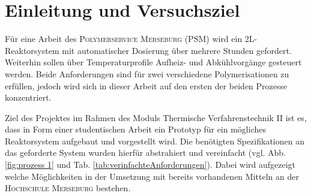 \section{Einleitung und Versuchsziel}
\label{sec:aufgabenstellung}

Für eine Arbeit des \textsc{Polymerservice Merseburg (PSM)} wird ein 2L-Reaktorsystem mit automatischer Dosierung über mehrere Stunden gefordert. Weiterhin sollen über Temperaturprofile Aufheiz- und Abkühlvorgänge gesteuert werden. Beide Anforderungen sind für zwei verschiedene Polymerisationen zu erfüllen, jedoch wird sich in dieser Arbeit auf den ersten der beiden Prozesse konzentriert. 

Ziel des Projektes im Rahmen des Moduls Thermische Verfahrenstechnik II ist es, dass in Form einer studentischen Arbeit ein Prototyp für ein mögliches Reaktorsystem aufgebaut und vorgestellt wird. Die benötigten Spezifikationen an das geforderte System wurden hierfür abstrahiert und vereinfacht (vgl. Abb. \ref{fig:prozess 1} und Tab. \ref{tab:verinfachteAnforderungen}). Dabei wird aufgezeigt welche Möglichkeiten in der Umsetzung mit bereits vorhandenen Mitteln an der \textsc{Hochschule Merseburg} bestehen.

